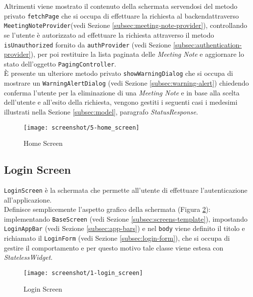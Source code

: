 Altrimenti viene mostrato il contenuto della schermata servendosi del metodo privato \lstinline{fetchPage} che si occupa di effettuare la richiesta al \gls{backend}\glsoccur attraverso \lstinline{MeetingNoteProvider}(vedi Sezione \ref{subsec:meeting-note-provider}), controllando se l'utente è autorizzato ad effettuare la richiesta attraverso il metodo \lstinline{isUnauthorized} fornito da \lstinline{authProvider} (vedi Sezione \ref{subsec:authentication-provider}), per poi restituire la lista paginata delle \emph{Meeting Note} e aggiornare lo stato dell'oggetto \lstinline{PagingController}. \\
È presente un ulteriore metodo privato \lstinline{showWarningDialog} che si occupa di mostrare un \lstinline{WarningAlertDialog} (vedi Sezione \ref{subsec:warning-alert}) chiedendo conferma l'utente per la eliminazione di una \emph{Meeting Note} e in base alla scelta dell'utente e all'esito della richiesta, vengono gestiti i seguenti casi {i medesimi illustrati nella Sezione \ref{subsec:model}, paragrafo \emph{StatusResponse}}.

\begin{figure}[!h] 
    \centering 
    \texttt{[image: screenshot/5-home\_screen]}
    \caption{Home Screen}
    \label{fig:home-screen}
\end{figure}

\newpage

\subsection{Login Screen}
\label{subsec:login-screen}

\lstinline{LoginScreen} è la schermata che permette all'utente di effettuare l'autenticazione all'applicazione. \\
Definisce semplicemente l'aspetto grafico della schermata (Figura \ref{fig:login-screen}): implementando \lstinline{BaseScreen} (vedi Sezione \ref{subsec:screens-template}), impostando \lstinline{LoginAppBar} (vedi Sezione \ref{subsec:app-bars}) e nel \lstinline{body} viene definito il titolo e richiamato il \lstinline{LoginForm} (vedi Sezione \ref{subsec:login-form}), che si occupa di gestire il comportamento e per questo motivo tale classe viene estesa con \emph{StatelessWidget}.

\begin{figure}[!h] 
    \centering 
    \texttt{[image: screenshot/1-login\_screen]} 
    \caption{Login Screen}
    \label{fig:login-screen}
\end{figure}

